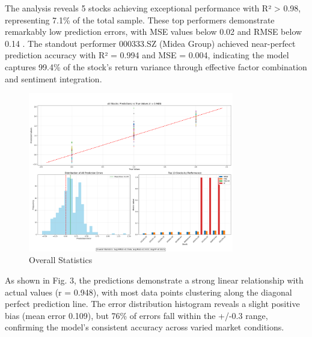 \documentclass[3p,times,procedia]{elsarticle}
\begin{document}
The analysis reveals 5 stocks achieving exceptional performance with R² > 0.98, representing 7.1\% of the total sample. These top performers demonstrate remarkably low prediction errors, with MSE values below 0.02 and RMSE below 0.14 \cite{Bao2017}. The standout performer 000333.SZ (Midea Group) achieved near-perfect prediction accuracy with R² = 0.994 and MSE = 0.004, indicating the model captures 99.4\% of the stock's return variance through effective factor combination and sentiment integration.
\begin{figure}[!ht] %
    \centering
    \includegraphics[width=0.80\textwidth]{Picture3.png} %

    \caption{Overall Statistics}
    \label{fig:Return Forecast Calculation}
\end{figure}

As shown in Fig. 3, the predictions demonstrate a strong linear relationship with actual values (r = 0.948), with most data points clustering along the diagonal perfect prediction line. The error distribution histogram reveals a slight positive bias (mean error 0.109), but 76\% of errors fall within the +/-0.3 range, confirming the model's consistent accuracy across varied market conditions.

\end{document}

